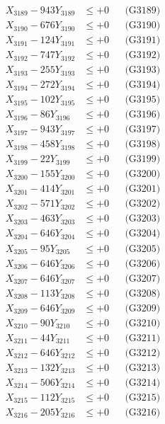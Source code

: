 \documentclass[a4paper,10pt]{article}
\begin{document}
{\begin{align}
X_{3189} - 943Y_{3189} &\leq +0 && \text{(G3189)} \\
X_{3190} - 676Y_{3190} &\leq +0 && \text{(G3190)} \\
\allowbreak
X_{3191} - 124Y_{3191} &\leq +0 && \text{(G3191)} \\
X_{3192} - 747Y_{3192} &\leq +0 && \text{(G3192)} \\
X_{3193} - 255Y_{3193} &\leq +0 && \text{(G3193)} \\
X_{3194} - 272Y_{3194} &\leq +0 && \text{(G3194)} \\
X_{3195} - 102Y_{3195} &\leq +0 && \text{(G3195)} \\
X_{3196} - 86Y_{3196} &\leq +0 && \text{(G3196)} \\
X_{3197} - 943Y_{3197} &\leq +0 && \text{(G3197)} \\
X_{3198} - 458Y_{3198} &\leq +0 && \text{(G3198)} \\
X_{3199} - 22Y_{3199} &\leq +0 && \text{(G3199)} \\
X_{3200} - 155Y_{3200} &\leq +0 && \text{(G3200)} \\
\allowbreak
X_{3201} - 414Y_{3201} &\leq +0 && \text{(G3201)} \\
X_{3202} - 571Y_{3202} &\leq +0 && \text{(G3202)} \\
X_{3203} - 463Y_{3203} &\leq +0 && \text{(G3203)} \\
X_{3204} - 646Y_{3204} &\leq +0 && \text{(G3204)} \\
X_{3205} - 95Y_{3205} &\leq +0 && \text{(G3205)} \\
X_{3206} - 646Y_{3206} &\leq +0 && \text{(G3206)} \\
X_{3207} - 646Y_{3207} &\leq +0 && \text{(G3207)} \\
X_{3208} - 113Y_{3208} &\leq +0 && \text{(G3208)} \\
X_{3209} - 646Y_{3209} &\leq +0 && \text{(G3209)} \\
X_{3210} - 90Y_{3210} &\leq +0 && \text{(G3210)} \\
\allowbreak
X_{3211} - 44Y_{3211} &\leq +0 && \text{(G3211)} \\
X_{3212} - 646Y_{3212} &\leq +0 && \text{(G3212)} \\
X_{3213} - 132Y_{3213} &\leq +0 && \text{(G3213)} \\
X_{3214} - 506Y_{3214} &\leq +0 && \text{(G3214)} \\
X_{3215} - 112Y_{3215} &\leq +0 && \text{(G3215)} \\
X_{3216} - 205Y_{3216} &\leq +0 && \text{(G3216)} \\

\end{align}}
\end{document}
